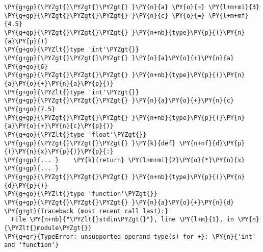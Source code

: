\begin{Verbatim}[commandchars=\\\{\}]
\PY{g+gp}{\PYZgt{}\PYZgt{}\PYZgt{} }\PY{n}{a} \PY{o}{=} \PY{l+m+mi}{3}
\PY{g+gp}{\PYZgt{}\PYZgt{}\PYZgt{} }\PY{n}{c} \PY{o}{=} \PY{l+m+mf}{4.5}
\PY{g+gp}{\PYZgt{}\PYZgt{}\PYZgt{} }\PY{n+nb}{type}\PY{p}{(}\PY{n}{a}\PY{p}{)}
\PY{g+go}{\PYZlt{}type 'int'\PYZgt{}}
\PY{g+gp}{\PYZgt{}\PYZgt{}\PYZgt{} }\PY{n}{a}\PY{o}{+}\PY{n}{a}
\PY{g+go}{6}
\PY{g+gp}{\PYZgt{}\PYZgt{}\PYZgt{} }\PY{n+nb}{type}\PY{p}{(}\PY{n}{a}\PY{o}{+}\PY{n}{a}\PY{p}{)}
\PY{g+go}{\PYZlt{}type 'int'\PYZgt{}}
\PY{g+gp}{\PYZgt{}\PYZgt{}\PYZgt{} }\PY{n}{a}\PY{o}{+}\PY{n}{c}
\PY{g+go}{7.5}
\PY{g+gp}{\PYZgt{}\PYZgt{}\PYZgt{} }\PY{n+nb}{type}\PY{p}{(}\PY{n}{a}\PY{o}{+}\PY{n}{c}\PY{p}{)}
\PY{g+go}{\PYZlt{}type 'float'\PYZgt{}}
\PY{g+gp}{\PYZgt{}\PYZgt{}\PYZgt{} }\PY{k}{def} \PY{n+nf}{d}\PY{p}{(}\PY{n}{x}\PY{p}{)}\PY{p}{:}
\PY{g+gp}{... }    \PY{k}{return} \PY{l+m+mi}{2}\PY{o}{*}\PY{n}{x}
\PY{g+gp}{... }
\PY{g+gp}{\PYZgt{}\PYZgt{}\PYZgt{} }\PY{n+nb}{type}\PY{p}{(}\PY{n}{d}\PY{p}{)}
\PY{g+go}{\PYZlt{}type 'function'\PYZgt{}}
\PY{g+gp}{\PYZgt{}\PYZgt{}\PYZgt{} }\PY{n}{a}\PY{o}{+}\PY{n}{d}
\PY{g+gt}{Traceback (most recent call last):}
  File \PY{n+nb}{"\PYZlt{}stdin\PYZgt{}"}, line \PY{l+m}{1}, in \PY{n}{\PYZlt{}module\PYZgt{}}
\PY{g+gr}{TypeError: unsupported operand type(s) for +}: \PY{n}{'int' and 'function'}
\end{Verbatim}
